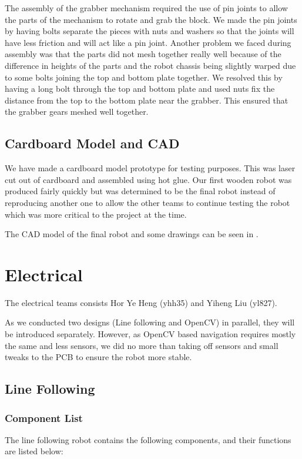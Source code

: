 \documentclass{article}
\begin{document}
\quad The assembly of the grabber mechanism required the use of pin joints to allow the parts of the mechanism to rotate and grab the block. We made the pin joints by having bolts separate the pieces with nuts and washers so that the joints will have less friction and will act like a pin joint. Another problem we faced during assembly was that the parts did not mesh together really well because of the difference in heights of the parts and the robot chassis being slightly warped due to some bolts joining the top and bottom plate together. We resolved this by having a long bolt through the top and bottom plate and used nuts fix the distance from the top to the bottom plate near the grabber. This ensured that the grabber gears meshed well together.

\subsection{Cardboard Model and CAD}
\quad We have made a cardboard model prototype for testing purposes. This was laser cut out of cardboard and assembled using hot glue. Our first wooden robot was produced fairly quickly but was determined to be the final robot instead of reproducing another one to allow the other teams to continue testing the robot which was more critical to the project at the time.

The CAD model of the final robot and some drawings can be seen in .

\section{Electrical}
\quad The electrical teams consists Hor Ye Heng (yhh35) and Yiheng Liu (yl827). 

As we conducted two designs (Line following and OpenCV) in parallel, they will be introduced separately. However, as OpenCV based navigation requires mostly the same and less sensors, we did no more than taking off sensors and small tweaks to the PCB to ensure the robot more stable.
\subsection{Line Following}
\subsubsection{Component List}
The line following robot contains the following components, and their functions are listed below:
\end{document}
